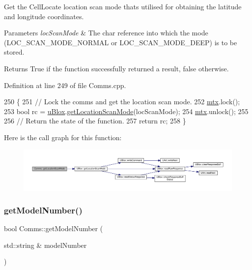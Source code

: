 Get the Cell\+Locate location scan mode that\textquotesingle{}s utilised for obtaining the latitude and longitude coordinates.


\begin{DoxyParams}{Parameters}
{\em loc\+Scan\+Mode} & The char reference into which the mode (L\+O\+C\+\_\+\+S\+C\+A\+N\+\_\+\+M\+O\+D\+E\+\_\+\+N\+O\+R\+M\+AL or L\+O\+C\+\_\+\+S\+C\+A\+N\+\_\+\+M\+O\+D\+E\+\_\+\+D\+E\+EP) is to be stored. \\
\hline
\end{DoxyParams}
\begin{DoxyReturn}{Returns}
True if the function successfully returned a result, false otherwise. 
\end{DoxyReturn}


Definition at line 249 of file Comms.\+cpp.


\begin{DoxyCode}
250 \{
251     \textcolor{comment}{// Lock the comms and get the location scan mode.}
252     \hyperlink{class_comms_a21df861b1202573e4cd0cb5666d638fe}{mtx}.lock();
253     \textcolor{keywordtype}{bool} rc = \hyperlink{class_comms_ac64dea134b116147e5441172346dbd6c}{uBlox}.\hyperlink{class_u_blox_a398db4cdc2d5356fb86b3cd1021bad1b}{getLocationScanMode}(locScanMode);
254     \hyperlink{class_comms_a21df861b1202573e4cd0cb5666d638fe}{mtx}.unlock();
255 
256     \textcolor{comment}{// Return the state of the function.}
257     \textcolor{keywordflow}{return} rc;
258 \}
\end{DoxyCode}
Here is the call graph for this function\+:
\nopagebreak
\begin{figure}[H]
\begin{center}
\leavevmode
\includegraphics[width=350pt]{d8/dcc/class_comms_a8f9893e235e62f8fc752f05a06383e68_cgraph}
\end{center}
\end{figure}
\mbox{\label{class_comms_a02eb048febea2d1a39a7fe9e064cf93c}} 
\subsubsection{\texorpdfstring{get\+Model\+Number()}{getModelNumber()}}
{\footnotesize\ttfamily bool Comms\+::get\+Model\+Number (\begin{DoxyParamCaption}\item[{std\+::string \&}]{model\+Number }\end{DoxyParamCaption})}

